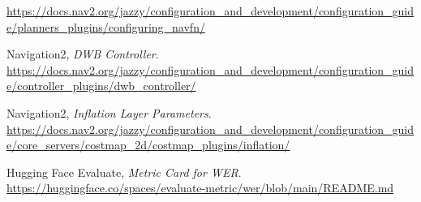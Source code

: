 \documentclass[13pt,a4paper]{extarticle}
\begin{document}
\begin{enumerate}[label={[\arabic*]},leftmargin=2em]
    \url{https://docs.nav2.org/jazzy/configuration_and_development/configuration_guide/planners_plugins/configuring_navfn/}
    \item \label{ref:dwb} Navigation2, \textit{DWB Controller}.\\
    \url{https://docs.nav2.org/jazzy/configuration_and_development/configuration_guide/controller_plugins/dwb_controller/}
    \item \label{ref:inflation} Navigation2, \textit{Inflation Layer Parameters}.\\
    \url{https://docs.nav2.org/jazzy/configuration_and_development/configuration_guide/core_servers/costmap_2d/costmap_plugins/inflation/}
    \item \label{ref:wer} Hugging Face Evaluate, \textit{Metric Card for WER}.\\
    \url{https://huggingface.co/spaces/evaluate-metric/wer/blob/main/README.md}
\end{enumerate}
\end{document}
